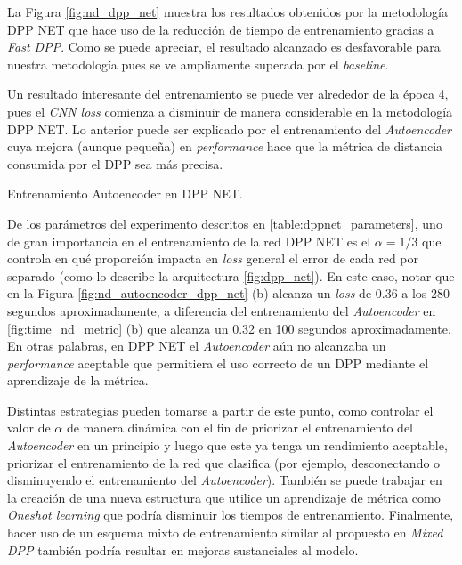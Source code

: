 La Figura \ref{fig:nd_dpp_net} muestra los resultados obtenidos por la metodología DPP NET que hace uso de la reducción de tiempo de entrenamiento gracias a \textit{Fast DPP}. Como se puede apreciar, el resultado alcanzado es desfavorable para nuestra metodología pues se ve ampliamente superada por el \textit{baseline}. 

\vspace{0.2cm}

Un resultado interesante del entrenamiento se puede ver alrededor de la época 4, pues el \textit{CNN loss} comienza a disminuir de manera considerable en la metodología DPP NET. Lo anterior puede ser explicado por el entrenamiento del \textit{Autoencoder} cuya mejora (aunque pequeña) en \textit{performance} hace que la métrica de distancia consumida por el DPP sea más precisa. 

\begin{images}[\label{fig:nd_autoencoder_dpp_net}]{\centering Entrenamiento Autoencoder en DPP NET.}
\end{images}

De los parámetros del experimento descritos en \ref{table:dppnet_parameters}, uno de gran importancia en el entrenamiento de la red DPP NET es el $\alpha = 1/3$ que controla en qué proporción impacta en \textit{loss} general el error de cada red por separado (como lo describe la arquitectura \ref{fig:dpp_net}). En este caso, notar que en la Figura \ref{fig:nd_autoencoder_dpp_net} (b) alcanza un \textit{loss} de 0.36 a los 280 segundos aproximadamente, a diferencia del entrenamiento del \textit{Autoencoder} en \ref{fig:time_nd_metric} (b) que alcanza un 0.32 en 100 segundos aproximadamente. En otras palabras, en DPP NET el \textit{Autoencoder} aún no alcanzaba un \textit{performance} aceptable que permitiera el uso correcto de un DPP mediante el aprendizaje de la métrica.

\vspace{0.2cm}

Distintas estrategias pueden tomarse a partir de este punto, como controlar el valor de $\alpha$ de manera dinámica con el fin de priorizar el entrenamiento del \textit{Autoencoder} en un principio y luego que este ya tenga un rendimiento aceptable, priorizar el entrenamiento de la red que clasifica (por ejemplo, desconectando o disminuyendo el entrenamiento del \textit{Autoencoder}). También se puede trabajar en la creación de una nueva estructura que utilice un aprendizaje de métrica como \textit{Oneshot learning} que podría disminuir los tiempos de entrenamiento. Finalmente, hacer uso de un esquema mixto de entrenamiento similar al propuesto en \textit{Mixed DPP} también podría resultar en mejoras sustanciales al modelo. 


